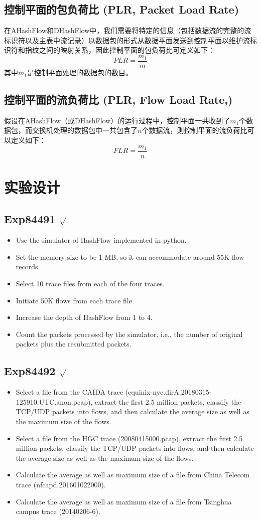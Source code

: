 \documentclass{article}
\begin{document}
\subsection{ 控制平面的包负荷比 (PLR, Packet Load Rate)}
在AHashFlow和DHashFlow中，我们需要将特定的信息（包括数据流的完整的流标识符以及主表中流记录）以数据包的形式从数据平面发送到控制平面以维护流标识符和指纹之间的映射关系，因此控制平面的包负荷比可定义如下：
$$
PLR = \frac{m_1}{m}
$$
其中$m_1$是控制平面处理的数据包的数目。

\subsection{控制平面的流负荷比 (PLR, Flow Load Rate,)}
假设在AHashFlow（或DHashFlow）的运行过程中，控制平面一共收到了$m_1$个数据包，而交换机处理的数据包中一共包含了$n$个数据流，则控制平面的流负荷比可以定义如下：
$$
FLR = \frac{m_1}{n}
$$

\section{实验设计}
\subsection{Exp84491 $\surd$}
\begin{itemize}
	\item Use the simulator of HashFlow implemented in python.
	\item Set the memory size to be 1 MB, so it can accommodate around 55K flow records.
	\item Select 10 trace files from each of the four traces.
	\item Initiate 50K flows from each trace file.
	\item Increase the depth of HashFlow from 1 to 4. 
	\item Count the packets processed by the simulator, i.e., the number of original packets plus the resubmitted packets.
\end{itemize}

\subsection{Exp84492 $\surd$}
\begin{itemize}
	\item Select a file from the CAIDA trace (equinix-nyc.dirA.20180315-125910.UTC.anon.pcap), extract the first 2.5 million packets, classify the TCP/UDP packets into flows, and then calculate the average size as well as the maximum size of the flows.
	\item Select a file from the HGC trace (20080415000.pcap), extract the first 2.5 million packets, classify the TCP/UDP packets into flows, and then calculate the average size as well as the maximum size of the flows.
	\item Calculate the average as well as maximum size of a file from China Telecom trace (nfcapd.201601022000).
	\item Calculate the average as well as maximum size of a file from Tsinghua campus trace (20140206-6). 
\end{itemize}
\end{document}
